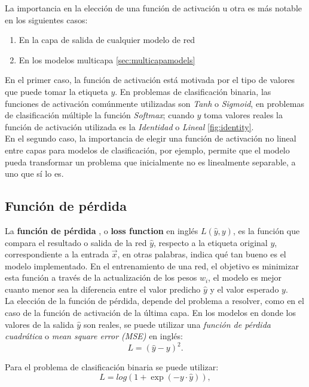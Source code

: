 La importancia en la elección de una función de activación u otra es más notable en los siguientes casos:
\begin{enumerate}
\item En la capa de salida de cualquier modelo de red
\item En los modelos multicapa \autoref{sec:multicapamodels}
\end{enumerate}
En el primer caso, la función de activación está motivada por el tipo de valores que puede tomar la etiqueta $y$. En problemas de clasificación binaria, las funciones de activación comúnmente utilizadas son \emph{Tanh} o \emph{Sigmoid}, en problemas de clasificación múltiple la función \emph{Softmax}; cuando $y$ toma valores reales la función de activación utilizada es la \emph{Identidad} o \emph{Lineal} \autoref{fig:identity}.
\\
En el segundo caso, la importancia de elegir una función de activación no lineal entre capas para modelos de clasificación, por ejemplo, permite que el modelo pueda transformar un problema que inicialmente no es linealmente separable, a uno que sí lo es.


\subsection{Función de pérdida}
La \textbf{función de pérdida} \cite{HINTON1989185}, o \textbf{loss function} en inglés $L(\hat{y},y)$, es la función que compara el resultado o salida de la red $\hat{y}$, respecto a la etiqueta original $y$, correspondiente a la entrada $\vec{x}$, en otras palabras, indica qué tan bueno es el modelo implementado. En el entrenamiento de una red, el objetivo es minimizar esta función a través de la actualización de los pesos $w_i$, el modelo es mejor cuanto menor sea la diferencia entre el valor predicho $\hat{y}$ y el valor esperado $y$.
\\
La elección de la función de pérdida, depende del problema a resolver, como en el caso de la función de activación de la última capa. En los modelos en donde los valores de la salida $\hat{y}$ son reales, se puede utilizar una \emph{función de pérdida cuadrática} o \emph{mean square error (MSE)} en inglés:
\begin{equation}
  \label{eq:MSE}
  L = (\hat{y}-y)^2.
\end{equation}

Para el problema de clasificación binaria se puede utilizar:
\begin{equation}
  \label{eq:bin}
  L = log(1 + \exp(−y\cdot \hat{y})),
\end{equation}

